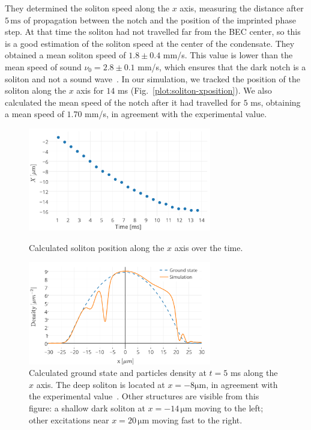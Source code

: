 They determined the soliton speed along the $x$ axis, measuring the distance after $5 \, \mathrm{ms}$ of propagation between the notch and the position of the imprinted phase step. At that time the soliton had not travelled far from the BEC center, so this is a good estimation of the soliton speed at the center of the condensate. They obtained a mean soliton speed of  $1.8 \pm 0.4$ mm/s. This value is lower than the mean speed of sound $\nu_0 = 2.8 \pm 0.1$ mm/s, which ensures that the dark notch is a soliton and not a sound wave~\citep{DSF00}. In our simulation, we tracked the position of the soliton along the $x$ axis for $14$ ms (Fig.~\ref{plot:soliton-xposition}). We also calculated the mean speed of the notch after it had travelled for $5$ ms, obtaining a mean speed of $1.70$ mm/s, in agreement with the experimental value.
\begin{figure}[h!]
    \centering
	\includegraphics[width=8cm]{Plots/soliton_track.pdf}
	\caption{Calculated soliton position along the $x$ axis over the time.} \label{plot:soliton-xposition}
	\includegraphics[width=8cm]{Plots/density_xprofile_5ms.pdf}
	\caption{Calculated ground state and particles density at $t = 5$ ms along the $x$ axis. The deep soliton is located at $x = -8 \mathrm{\mu m}$, in agreement with the experimental value~\citep{DSF00}. Other structures are visible from this figure: a shallow  dark soliton at $x = -14 \, \mathrm{\mu m}$ moving to the left; other excitations near $x = 20 \, \mathrm{\mu m}$ moving fast to the right.} \label{plot:density_5ms}
\end{figure}

